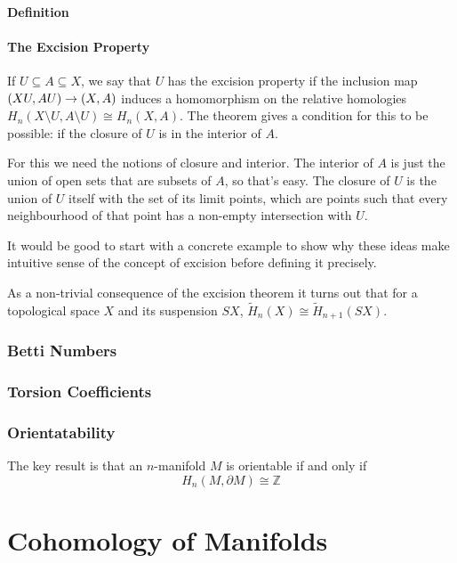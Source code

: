 \documentclass[oneside,english]{amsbook}
\numberwithin{section}{chapter}
\theoremstyle{plain}
\theoremstyle{definition}
\begin{document}
	\subsection{Definition}
	
	\subsection{The Excision Property}
	
	If $U\subseteq A\subseteq X$, we say that $U$ has the excision property if the inclusion map $(X\\ U, A\\ U)\to (X, A)$ induces a homomorphism on the relative homologies $H_{n}(X\setminus U,A\setminus U)\cong H_{n}(X,A)$. The theorem gives a condition for this to be possible: if the closure of $U$ is in the interior of $A$.
	
	For this we need the notions of closure and interior. The interior of $A$ is just the union of open sets that are subsets of $A$, so that's easy. The closure of $U$ is the union of $U$ itself with the set of its limit points, which are points such that every neighbourhood of that point has a non-empty intersection with $U$.
	
	It would be good to start with a concrete example to show why these ideas make intuitive sense of the concept of excision before defining it precisely.
	
	As a non-trivial consequence of the excision theorem it turns out that for a topological space $X$ and its suspension $SX$, $\widetilde{H}_n(X)\cong \widetilde{H}_{n+1}(SX)$.

	\section{Betti Numbers}
	
	\section{Torsion Coefficients}

	\section{Orientatability}
	
	The key result is that an $n$-manifold $M$ is orientable if and only if
	\[
		H_n(M, \partial M) \cong \mathbb{Z}  
	\]
	
	\part{Cohomology of Manifolds}
	
\end{document}
